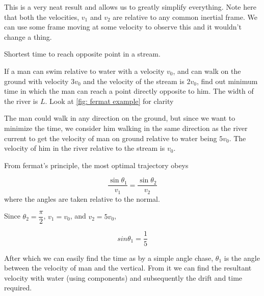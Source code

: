 This is a very neat result and allows us to greatly simplify everything. Note 
here that both the velocities, \(v_1\) and \(v_2\) are relative to any common inertial
frame. We can use some frame moving at some velocity to observe this and it wouldn't change 
a thing. 

\begin{marginfigure}
    \vspace{5em}
    \centering
    \caption{Shortest time to reach opposite point in a stream.}
    \label{fig: fermat example}
\end{marginfigure}

\begin{example}
    If a man can swim relative to water with a velocity \(v_0\), and can walk on the ground 
    with velocity \(3v_0\) and the velocity of the stream is \(2v_0\), find out minimum time 
    in which the man can reach a point directly opposite to him. The width of the river is \(L\).
    Look at \cref{fig: fermat example} for clarity

    \begin{soln}
        The man could walk in any direction on the ground, but since we want to minimize 
        the time, we consider him walking in the same direction as the river current to get 
        the velocity of man on ground relative to water being \(5v_0\). The velocity 
        of him in the river relative to the stream is \(v_0\). 

        From fermat's principle, the most optimal trajectory obeys 
        
        \begin{equation*}
            \frac{\sin\theta_1}{v_1} = \frac{\sin\theta_2}{v_2}
        \end{equation*}
        where the angles are taken relative to the normal. 
        
        Since \(\theta_2 = \dfrac{\pi}{2}\), \(v_1 = v_0\), and \(v_2 = 5v_0\),

        \begin{equation*}
            sin\theta_1 = \frac{1}{5}
        \end{equation*}

        After which we can easily find the time as by a simple angle chase, \(\theta_1\) is 
        the angle between the velocity of man and the vertical. From it we 
        can find the resultant velocity with water (using components) 
        and subsequently the drift and time required.
    \end{soln}
\end{example}


